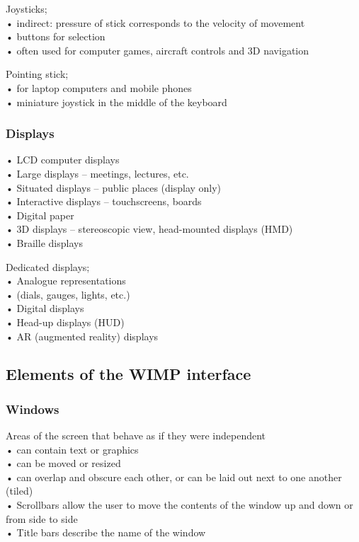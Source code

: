 \documentclass[]{project_plan}
\begin{document}
Joysticks;\\
• indirect: pressure of stick corresponds to the velocity of movement\\
• buttons for selection\\
• often used for computer games, aircraft controls and 3D navigation

Pointing stick;\\
• for laptop computers and mobile phones\\
• miniature joystick in the middle of the keyboard

\subsubsection{Displays}
• LCD computer displays\\
• Large displays – meetings, lectures, etc.\\
• Situated displays – public places (display only)\\
• Interactive displays – touchscreens, boards\\
• Digital paper\\
• 3D displays – stereoscopic view, head-mounted displays (HMD)\\
• Braille displays

Dedicated displays;\\
• Analogue representations\\
• (dials, gauges, lights, etc.)\\
• Digital displays\\
• Head-up displays (HUD)\\
• AR (augmented reality) displays

\subsection{Elements of the WIMP interface}

\subsubsection{Windows}

Areas of the screen that behave as if they were independent\\
• can contain text or graphics\\
• can be moved or resized\\
• can overlap and obscure each other, or can be laid out next to one another (tiled)\\
• Scrollbars allow the user to move the contents of the window up and down or from side to side\\
• Title bars describe the name of the window
\end{document}
